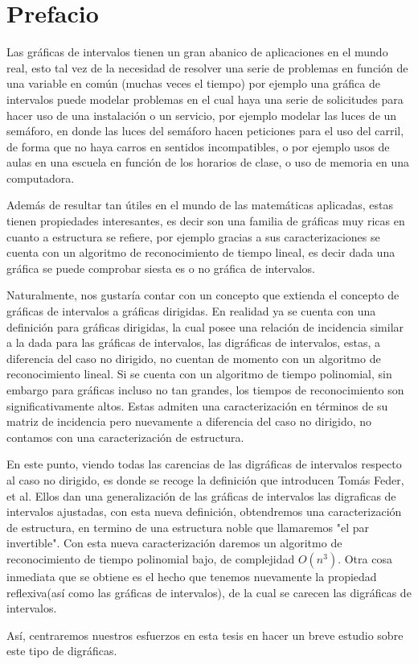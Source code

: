 \chapter*{Prefacio}
\label{sec:prfcio}

Las gráficas de intervalos tienen un gran abanico de aplicaciones en el mundo real, esto tal vez de la necesidad de resolver una serie de problemas en función de una variable en común (muchas veces el tiempo) por ejemplo una gráfica de intervalos puede modelar problemas en el cual haya una serie de solicitudes para hacer uso de una instalación o un servicio, por ejemplo modelar las luces de un semáforo, en donde las luces del semáforo hacen peticiones para el uso del carril, de forma que no haya carros en sentidos incompatibles, o por ejemplo usos de aulas en una escuela en función de los horarios de clase, o uso de memoria en una computadora. 

Además de resultar tan útiles en el mundo de las matemáticas aplicadas, estas tienen propiedades interesantes, es decir son una familia de gráficas muy ricas en cuanto a estructura se refiere, por ejemplo gracias a sus caracterizaciones se cuenta con un algoritmo de reconocimiento de tiempo lineal, es decir dada una gráfica se puede comprobar siesta es o no gráfica de intervalos. 

Naturalmente, nos gustaría contar con un concepto que extienda el concepto de gráficas de intervalos a gráficas dirigidas. 
En realidad ya se cuenta con una definición para gráficas dirigidas, la cual posee una relación de incidencia similar a la dada para las gráficas de intervalos, las digráficas de intervalos, estas, a diferencia del caso no dirigido, no cuentan de momento con un algoritmo de reconocimiento lineal. Si se cuenta con un algoritmo de tiempo polinomial, sin embargo para gráficas incluso no tan grandes, los tiempos de reconocimiento son significativamente altos. 
Estas admiten una caracterización en términos de su matriz de incidencia pero nuevamente a diferencia del caso no dirigido, no contamos con una caracterización de estructura.

En este punto, viendo todas las carencias de las digráficas de intervalos respecto al caso no dirigido, es donde se recoge la definición que introducen Tomás Feder, et al. Ellos dan una generalización de las gráficas de intervalos las digraficas de intervalos ajustadas, con esta nueva definición, obtendremos una caracterización de estructura, en termino de una estructura noble que llamaremos "el par invertible". Con esta nueva caracterización daremos un algoritmo de reconocimiento de tiempo polinomial bajo, de complejidad $O(n^3)$. Otra cosa inmediata que se obtiene es el hecho que tenemos nuevamente la propiedad reflexiva(así como las gráficas de intervalos), de la cual se carecen las digráficas de intervalos.

Así, centraremos nuestros esfuerzos en esta tesis en hacer un breve estudio sobre este tipo de digráficas.